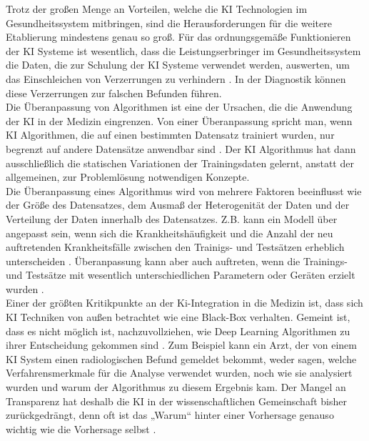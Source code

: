 Trotz der großen Menge an Vorteilen, welche die KI Technologien im Gesundheitssystem mitbringen, sind die Herausforderungen für die weitere Etablierung mindestens genau so groß. Für das ordnungsgemäße Funktionieren der KI Systeme ist wesentlich, dass die Leistungserbringer im Gesundheitssystem die Daten, die zur Schulung der KI Systeme verwendet werden, auswerten, um das Einschleichen von Verzerrungen zu verhindern \cite{Chapter_14}. In der Diagnostik können diese Verzerrungen zur falschen Befunden führen.\\

Die Überanpassung von Algorithmen ist eine der Ursachen, die die Anwendung der KI in der Medizin eingrenzen. Von einer Überanpassung spricht man, wenn KI Algorithmen, die auf einen bestimmten Datensatz trainiert wurden, nur begrenzt auf andere Datensätze anwendbar sind \cite{AI_where_are_we_now}. Der KI Algorithmus hat dann ausschließlich die statischen Variationen der Trainingsdaten gelernt, anstatt der allgemeinen, zur Problemlösung notwendigen Konzepte.\\ Die Überanpassung eines Algorithmus wird von mehrere Faktoren beeinflusst wie der Größe des Datensatzes, dem Ausmaß der Heterogenität der Daten und der Verteilung der Daten innerhalb des Datensatzes. Z.B. kann ein Modell über angepasst sein, wenn sich die Krankheitshäufigkeit und die Anzahl der neu auftretenden Krankheitsfälle zwischen den Trainigs- und Testsätzen erheblich unterscheiden \cite{AI_where_are_we_now}. Überanpassung kann aber auch auftreten, wenn die Trainings- und Testsätze mit wesentlich unterschiedlichen Parametern oder Geräten erzielt wurden \cite{AI_where_are_we_now}.\\

Einer der größten Kritikpunkte an der Ki-Integration in die Medizin ist, dass sich KI Techniken von außen betrachtet wie eine Black-Box verhalten\cite{The_missing_pieces}. Gemeint ist, dass es nicht möglich ist, nachzuvollziehen, wie Deep Learning Algorithmen zu ihrer Entscheidung gekommen sind \cite{The_missing_pieces}. Zum Beispiel kann ein Arzt, der von einem KI System einen radiologischen Befund gemeldet bekommt, weder sagen, welche Verfahrensmerkmale für die Analyse verwendet wurden, noch wie sie analysiert wurden und warum der Algorithmus zu diesem Ergebnis kam\cite{The_missing_pieces}. Der Mangel an Transparenz hat deshalb die KI in der wissenschaftlichen Gemeinschaft bisher zurückgedrängt, denn oft ist das „Warum“ hinter einer Vorhersage genauso wichtig wie die Vorhersage selbst \cite{The_missing_pieces}.\\

